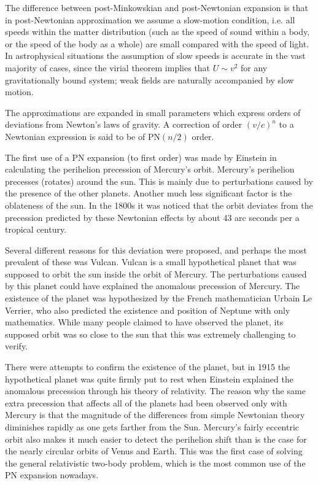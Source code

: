 \documentclass[english, oneside]{HYgradu}
\begin{document}
The difference between post-Minkowskian and post-Newtonian expansion is that in post-Newtonian approximation we assume a slow-motion condition, i.e. all speeds within the matter
distribution (such as the speed of sound within a body, or the speed of the body as a whole)
are small compared with the speed of light. In astrophysical situations the assumption of slow speeds is accurate in the vast majority of cases, since the virial theorem implies that $U \sim v^2$ for any gravitationally bound system; weak fields are naturally accompanied by slow motion.



The approximations are expanded in small parameters which express orders of deviations from Newton's laws of gravity. A correction of order $(v/c)^n$ to a Newtonian expression is said to be of $\mathrm{PN}(n/2)$ order.

The first use of a PN expansion (to first order) was made by Einstein in calculating the perihelion precession of Mercury's orbit.
Mercury's perihelion precesses (rotates) around the sun. This is mainly due to perturbations caused by the presence of the other planets. Another much less significant factor is the oblateness of the sun. In the 1800s it was noticed that the orbit deviates from the precession predicted by these Newtonian effects by about 43 arc seconds per a tropical century.

Several different reasons for this deviation were proposed, and perhaps the most prevalent of these was Vulcan. Vulcan is a small hypothetical planet that was supposed to orbit the sun inside the orbit of Mercury. The perturbations caused by this planet could have explained the anomalous precession of Mercury. The existence of the planet was hypothesized by the French mathematician Urbain Le Verrier, who also predicted the existence and position of Neptune with only mathematics. While many people claimed to have observed the planet, its supposed orbit was so close to the sun that this was extremely challenging to verify.

There were attempts to confirm the existence of the planet, but in 1915 the hypothetical planet was quite firmly put to rest when Einstein explained the anomalous precession through his theory of relativity. The reason why the same extra precession that affects all of the planets had been observed only with Mercury is that the magnitude of the differences from simple Newtonian theory diminishes rapidly as one gets farther from the Sun. Mercury's fairly eccentric orbit also makes it much easier to detect the perihelion shift than is the case for the nearly circular orbits of Venus and Earth.
This was the first case of solving the general relativistic two-body problem, which is the most common use of the PN expansion nowadays. %
\end{document}

